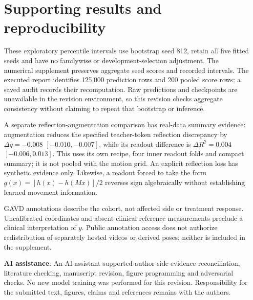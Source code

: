 \documentclass{article}
\begin{document}
\section{Supporting results and
reproducibility}\label{supporting-results-and-reproducibility}

These exploratory percentile intervals use bootstrap seed 812, retain
all five fitted seeds and have no familywise or development-selection
adjustment. The numerical supplement preserves aggregate seed scores and
recorded intervals. The executed report identifies 125,000 prediction
rows and 200 pooled score rows; a saved audit records their
recomputation. Raw predictions and checkpoints are unavailable in the
revision environment, so this revision checks aggregate consistency
without claiming to repeat that bootstrap or inference.

A separate reflection-augmentation comparison has real-data summary
evidence: augmentation reduces the specified teacher-token reflection
discrepancy by \(\Delta q=-0.008\) \([-0.010,-0.007]\), while its
readout difference is \(\Delta R^2=0.004\) \([-0.006,0.013]\). This uses
its own recipe, four inner readout folds and compact summary; it is not
pooled with the motion grid. An explicit reflection loss has synthetic
evidence only. Likewise, a readout forced to take the form
\(g(x)=[h(x)-h(Mx)]/2\) reverses sign algebraically without establishing
learned movement information.

GAVD annotations describe the cohort, not affected side or treatment
response. Uncalibrated coordinates and absent clinical reference
measurements preclude a clinical interpretation of \(y\). Public
annotation access does not authorize redistribution of separately hosted
videos or derived poses; neither is included in the supplement.

\textbf{AI assistance.} An AI assistant supported author-side evidence
reconciliation, literature checking, manuscript revision, figure
programming and adversarial checks. No new model training was performed
for this revision. Responsibility for the submitted text, figures,
claims and references remains with the authors.
\end{document}

